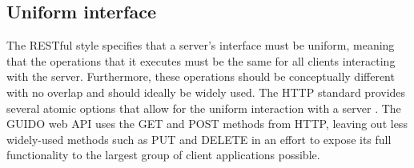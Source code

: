 \documentclass[11pt,a4paper]{article}
\begin{document}
\subsection{Uniform interface}
The RESTful style specifies that a server's interface must be uniform, meaning that the operations that it executes must be the same for all clients interacting with the server.  Furthermore, these operations should be conceptually different with no overlap and should ideally be widely used.  The HTTP standard provides several atomic options that allow for the uniform interaction with a server \cite{richardson2008restful}.  The GUIDO web API uses the GET and POST methods from HTTP, leaving out less widely-used methods such as PUT and DELETE in an effort to expose its full functionality to the largest group of client applications possible.
\end{document}
